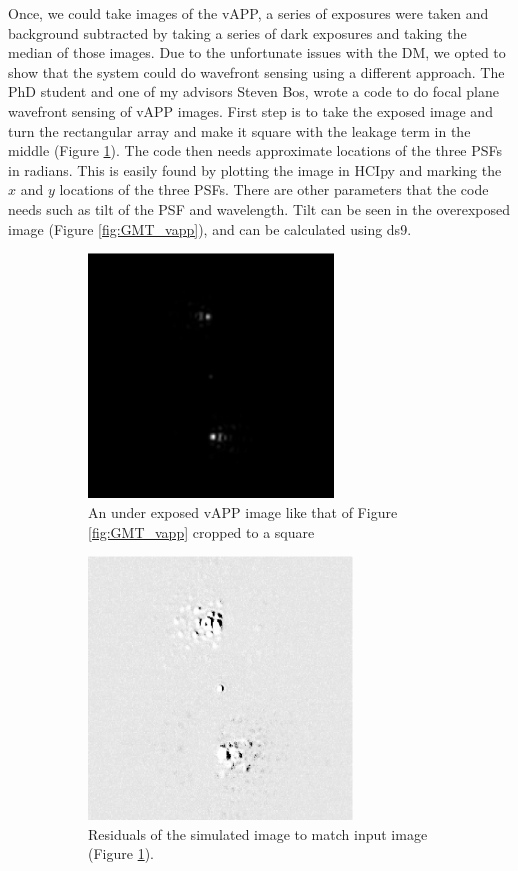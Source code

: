 Once, we could take images of the vAPP, a series of exposures were taken and background subtracted by taking a series of dark exposures and taking the median of those images.  Due to the unfortunate issues with the DM, we opted to show that the system could do wavefront sensing using a different approach.  The PhD student and one of my advisors Steven Bos, wrote a code to do focal plane wavefront sensing of vAPP images.  First step is to take the exposed image and turn the rectangular array and make it square with the leakage term in the middle (Figure \ref{fig:square_vapp}).  The code then needs approximate locations of the three PSFs in radians.  This is easily found by plotting the image in HCIpy and marking the $x$ and $y$ locations of the three PSFs.  There are other parameters that the code needs such as tilt of the PSF and wavelength.  Tilt can be seen in the overexposed image (Figure \ref{fig:GMT_vapp}), and can be calculated using ds9.

\begin{figure}[H]
\centering
\begin{subfigure}{.5\textwidth}
  \centering
  \includegraphics[width=6.5cm]{Figures/vapp_square.png}
  \caption{An under exposed vAPP image like that of Figure \ref{fig:GMT_vapp} cropped to a square}
  \label{fig:square_vapp}
\end{subfigure}%
\begin{subfigure}{.5\textwidth}
  \centering
  \includegraphics[width=7cm]{Figures/residual.png}
  \caption{Residuals of the simulated image to match input image (Figure \ref{fig:square_vapp}).}
  \label{fig:sim_square}
\end{subfigure}
\caption{}
\label{fig:code_images}
\end{figure}


